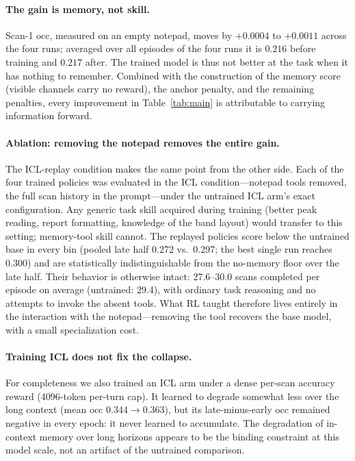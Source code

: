 \documentclass[11pt]{article}
\newcommand{\occ}{\ensuremath{\mathrm{occ}}}
\begin{document}
\paragraph{The gain is memory, not skill.}
Scan-1 \occ{}, measured on an empty notepad, moves by $+0.0004$ to $+0.0011$
across the four runs; averaged over all episodes of the four runs it is $0.216$
before training and $0.217$ after. The trained model is thus not better at the
task when it has nothing to remember. Combined with the construction of the
memory score (visible channels carry no reward), the anchor penalty, and the
remaining penalties, every improvement in Table~\ref{tab:main} is attributable to
carrying information forward.

\paragraph{Ablation: removing the notepad removes the entire gain.}
The ICL-replay condition makes the same point from the other side. Each of the
four trained policies was evaluated in the ICL condition---notepad tools removed,
the full scan history in the prompt---under the untrained ICL arm's exact
configuration. Any generic task skill acquired during training (better peak
reading, report formatting, knowledge of the band layout) would transfer to this
setting; memory-tool skill cannot. The replayed policies score below the untrained
base in every bin (pooled late half 0.272 vs.\ 0.297; the best single run reaches
0.300) and are statistically indistinguishable from the no-memory floor over the
late half. Their behavior is otherwise intact: 27.6--30.0 scans completed per
episode on average (untrained: 29.4), with ordinary task reasoning and no attempts
to invoke the absent tools. What RL taught therefore lives entirely in the
interaction with the notepad---removing the tool recovers the base model, with a
small specialization cost.

\paragraph{Training ICL does not fix the collapse.}
For completeness we also trained an ICL arm under a dense per-scan accuracy reward
(4096-token per-turn cap). It learned to degrade somewhat less over
the long context (mean \occ{} $0.344 \rightarrow 0.363$), but its late-minus-early
\occ{} remained negative in every epoch: it never learned to accumulate. The
degradation of in-context memory over long horizons appears to be the binding
constraint at this model scale, not an artifact of the untrained comparison.
\end{document}
